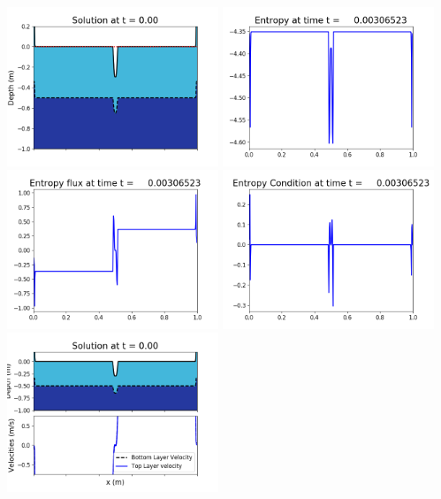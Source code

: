 \documentclass[11pt]{article}
\begin{document}
\includegraphics[width=0.475\textwidth]{frame0008fig1006.png}
\vskip 10pt 
\includegraphics[width=0.475\textwidth]{frame0008fig1007.png}
\includegraphics[width=0.475\textwidth]{frame0008fig1008.png}
\vskip 10pt 
\includegraphics[width=0.475\textwidth]{frame0008fig1009.png}
\vskip 10pt 
\includegraphics[width=0.475\textwidth]{frame0009fig1001.png}
\end{document}

